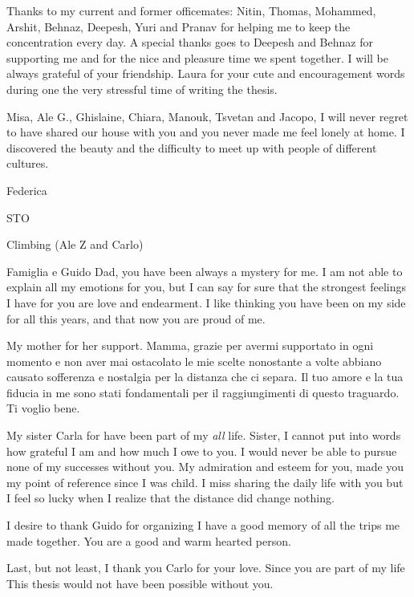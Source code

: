 Thanks to my current and former officemates: Nitin, Thomas, Mohammed, Arshit, Behnaz, Deepesh, Yuri and Pranav for helping me to keep the concentration every day.
A  special thanks goes to Deepesh and Behnaz for supporting me and for the nice and pleasure time we spent together. I will be always grateful of your friendship. 
Laura for your cute and encouragement words during one the very stressful time of writing the thesis.

Misa, Ale G., Ghislaine, Chiara, Manouk, Tsvetan and Jacopo, I will never regret to have shared our house with you and you never made me feel lonely at home. I discovered the beauty and the difficulty to meet up with people of different cultures.

Federica

STO

Climbing (Ale Z and Carlo)

Famiglia e Guido
Dad, you have been always a mystery for me. I am not able to explain all my emotions for you, but I can say for sure that the strongest feelings I have for you are love and endearment. 
I like thinking you have been on my side for all this years, and that now you are proud of me.

My mother for her support. Mamma, grazie per avermi supportato in ogni momento e non aver mai ostacolato le mie scelte nonostante a volte abbiano causato sofferenza e nostalgia per la distanza che ci separa. Il tuo amore e la tua fiducia in me sono stati fondamentali per il raggiungimenti di questo traguardo. Ti voglio bene.   

My sister Carla for have been part of my \textit{all} life. Sister, I cannot put into words how grateful I am and how much I owe to you. 
I would never be able to pursue none of my successes without you.
My admiration and esteem for you, made you my point of reference since I was child. 
I miss sharing the daily life with you but I feel so lucky when I realize that the distance did change nothing. 

I desire to thank Guido for organizing 
I have a good memory of all the trips me made together. You are a good and warm hearted person. 

Last, but not least, I thank you Carlo for your love. Since you are part of my life 
This thesis would not have been possible without you. 



